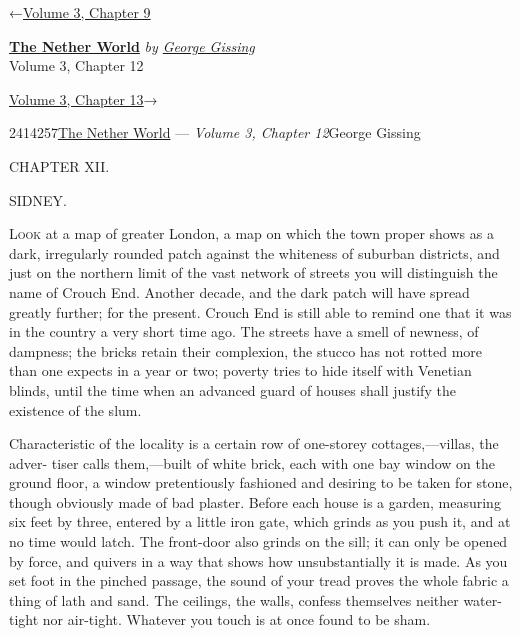 \hypertarget{headerContainer}{}
\hypertarget{navigationHeader}{}
\protect\hypertarget{headerprevious}{}{←\href{/wiki/The_Nether_World/Volume_3/Chapter_9}{Volume
3, Chapter 9}}

\textbf{\protect\hypertarget{header_title_text}{}{\href{/wiki/The_Nether_World}{The
Nether World}}} \emph{by
\href{/wiki/Author:George_Gissing}{\protect\hypertarget{header_author_text}{}{{George
Gissing}}}}\\
\protect\hypertarget{header_section_text}{}{Volume 3, Chapter 12}

\protect\hypertarget{headernext}{}{\href{/wiki/The_Nether_World/Volume_3/Chapter_13}{Volume
3, Chapter 13}→}

\hypertarget{navigationNotes}{}

\hypertarget{ws-data}{}
\protect\hypertarget{ws-article-id}{}{2414257}\protect\hypertarget{ws-title}{}{\href{/wiki/The_Nether_World}{The
Nether World} --- \emph{Volume 3, Chapter
12}}\protect\hypertarget{ws-author}{}{George Gissing}

{\protect\hypertarget{251}{}{}}

{CHAPTER XII.}

{SIDNEY.}

\textsc{Look} at a map of greater London, a map on which the town proper
shows as a dark, irregularly rounded patch against the whiteness of
suburban districts, and just on the northern limit of the vast network
of streets you will distinguish the name of Crouch End. Another decade,
and the dark patch will have spread greatly further; for the present.
Crouch End is still able to remind one that it was in the country a very
short time ago. The streets have a smell of newness, of dampness; the
bricks retain their complexion, the stucco has not rotted more than one
expects in a year or two; poverty tries to hide itself with Venetian
blinds, until the time when an advanced guard of houses shall justify
the existence of the slum.

Characteristic of the locality is a certain row of one-storey
cottages,---villas, the adver- {\protect\hypertarget{252}{}{}} tiser
calls them,---built of white brick, each with one bay window on the
ground floor, a window pretentiously fashioned and desiring to be taken
for stone, though obviously made of bad plaster. Before each house is a
garden, measuring six feet by three, entered by a little iron gate,
which grinds as you push it, and at no time would latch. The front-door
also grinds on the sill; it can only be opened by force, and quivers in
a way that shows how unsubstantially it is made. As you set foot in the
pinched passage, the sound of your tread proves the whole fabric a thing
of lath and sand. The ceilings, the walls, confess themselves neither
water-tight nor air-tight. Whatever you touch is at once found to be
sham.

